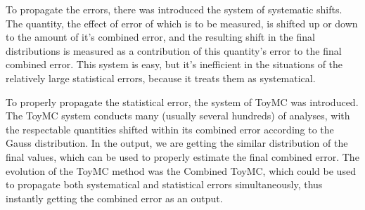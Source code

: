 To propagate the errors, there was introduced the system of systematic shifts. The quantity, the effect of error of which is to be measured, is shifted up or down to the amount of it's combined error, and the resulting shift in the final distributions is measured as a contribution of this quantity's error to the final combined error. This system is easy, but it's inefficient in the situations of the relatively large statistical errors, because it treats them as systematical.

To properly propagate the statistical error, the system of ToyMC was introduced. The ToyMC system conducts many (usually several hundreds) of analyses, with the respectable quantities shifted within its combined error according to the Gauss distribution. In the output, we are getting the similar distribution of the final values, which can be used to properly estimate the final combined error. The evolution of the ToyMC method was the Combined ToyMC, which could be used to propagate both systematical and statistical errors simultaneously, thus instantly getting the combined error as an output.
